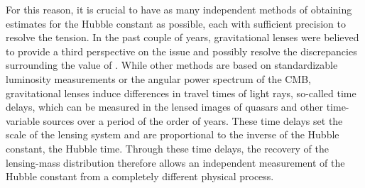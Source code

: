 For this reason, it is crucial to have as many independent methods of obtaining
estimates for the Hubble constant as possible, each with sufficient precision to
resolve the tension.  In the past couple of years, gravitational lenses were
believed to provide a third perspective on the issue and possibly resolve the
discrepancies surrounding the value of \Ho{}.  While other methods are based on
standardizable luminosity measurements or the angular power spectrum of the CMB,
gravitational lenses induce differences in travel times of light rays, so-called
time delays, which can be measured in the lensed images of quasars and other
time-variable sources over a period of the order of years.  These time delays
set the scale of the lensing system and are proportional to the inverse of the
Hubble constant, the Hubble time.  Through these time delays, the recovery of
the lensing-mass distribution therefore allows an independent measurement of the
Hubble constant from a completely different physical process.  

